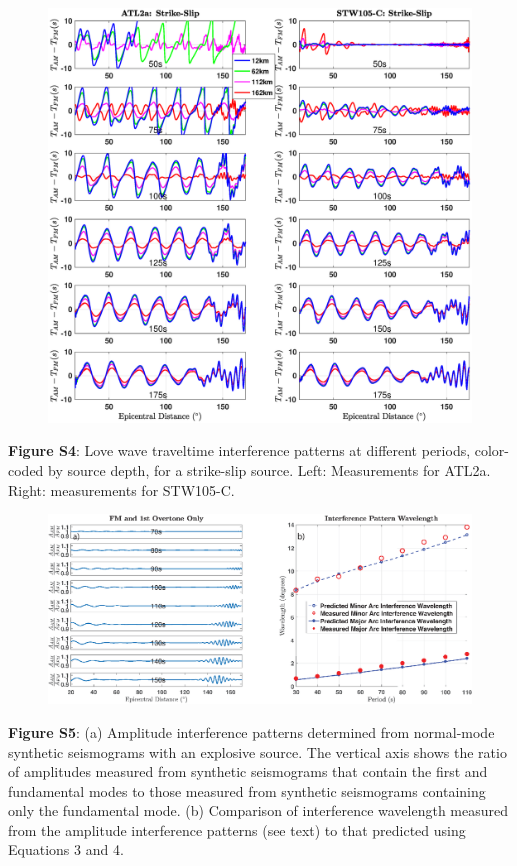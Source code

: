 \documentclass[extra,mreferee]{gji}
\begin{document}
\newpage
\begin{figure}
 \noindent\includegraphics[width=1\textwidth]{FigS4_VSver.eps}
\end{figure}
\textbf{Figure S4}: Love wave traveltime interference patterns at different periods, color-coded by source depth, for a strike-slip source. Left: Measurements for ATL2a. Right: measurements for STW105-C.

\newpage
\begin{figure}
 \noindent\includegraphics[width=1\textwidth]{FigS5_VSver.eps}
\end{figure}
\textbf{Figure S5}: (a) Amplitude interference patterns determined from normal-mode synthetic seismograms with an explosive source. The vertical axis shows the ratio of amplitudes measured from synthetic seismograms that contain the first and fundamental modes to those measured from synthetic seismograms containing only the fundamental mode. (b) Comparison of interference wavelength measured from the amplitude interference patterns (see text) to that predicted using Equations 3 and 4.
\end{document}

